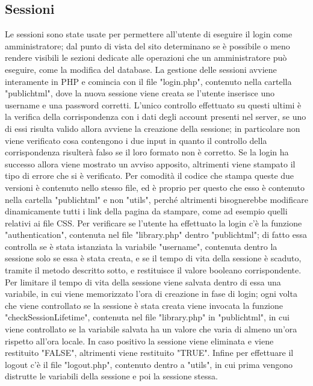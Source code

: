 {	\subsection{Sessioni}{
		Le sessioni sono state usate per permettere all'utente di eseguire il login come amministratore; dal punto di vista del sito determinano se è possibile o meno rendere visibili le sezioni dedicate alle operazioni che un amministratore può eseguire, come la modifica del database. La gestione delle sessioni avviene interamente in PHP e comincia con il file "login.php", contenuto nella cartella "public\textunderscore html", dove la nuova sessione viene creata se l'utente inserisce uno username e una password corretti. L'unico controllo effettuato su questi ultimi è la verifica della corrispondenza con i dati degli account presenti nel server, se uno di essi risulta valido allora avviene la creazione della sessione; in particolare non viene verificato cosa contengono i due input in quanto il controllo della corrispondenza risulterà falso se il loro formato non è corretto. Se la login ha successo allora viene mostrato un avviso apposito, altrimenti viene stampato il tipo di errore che si è verificato. Per comodità il codice che stampa queste due versioni è contenuto nello stesso file, ed è proprio per questo che esso è contenuto nella cartella "public\textunderscore html" e non "utils", perché altrimenti bisognerebbe modificare dinamicamente tutti i link della pagina da stampare, come ad esempio quelli relativi ai file CSS.
		Per verificare se l'utente ha effettuato la login c'è la funzione "authentication", contenuta nel file "library.php" dentro "public\textunderscore html"; di fatto essa controlla se è stata istanziata la variabile "username", contenuta dentro la sessione solo se essa è stata creata, e se il tempo di vita della sessione è scaduto, tramite il metodo descritto sotto, e restituisce il valore booleano corrispondente.
		Per limitare il tempo di vita della sessione viene salvata dentro di essa una variabile, in cui viene memorizzato l'ora di creazione in fase di login; ogni volta che viene controllato se la sessione è stata creata viene invocata la funzione "checkSessionLifetime", contenuta nel file "library.php" in "public\textunderscore html", in cui viene controllato se la variabile salvata ha un valore che varia di almeno un'ora rispetto all'ora locale. In caso positivo la sessione viene eliminata e viene restituito "FALSE", altrimenti viene restituito "TRUE".
		Infine per effettuare il logout c'è il file "logout.php", contenuto dentro a "utils", in cui prima vengono distrutte le variabili della sessione e poi la sessione stessa.
	}
}